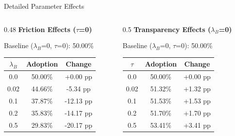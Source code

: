 \documentclass{beamer}
\begin{document}
\begin{frame}{Detailed Parameter Effects}
  \begin{columns}[T]
    \begin{column}{0.48\textwidth}
      \centering
      \textbf{Friction Effects ($\tau$=0)}
      
      \vspace{0.3em}
      \small{Baseline ($\lambda_B$=0, $\tau$=0): 50.00\%}
      
      \vspace{0.5em}
      
      \begin{table}[h]
        \centering
        \begin{tabular}{|c|c|c|}
          \hline
          \textbf{$\lambda_B$} & \textbf{Adoption} & \textbf{Change} \\
          \hline
          0.0 & 50.00\% & +0.00 pp \\
          \hline
          0.02 & 44.66\% & -5.34 pp \\
          \hline
          0.1 & 37.87\% & -12.13 pp \\
          \hline
          0.2 & 35.83\% & -14.17 pp \\
          \hline
          0.5 & 29.83\% & -20.17 pp \\
          \hline
        \end{tabular}
      \end{table}
    \end{column}
    
    \begin{column}{0.5\textwidth}
      \centering
      \textbf{Transparency Effects ($\lambda_B$=0)}
      
      \vspace{0.3em}
      \small{Baseline ($\lambda_B$=0, $\tau$=0): 50.00\%}
      
      \vspace{0.5em}
      
      \begin{table}[h]
        \centering
        \begin{tabular}{|c|c|c|}
          \hline
          \textbf{$\tau$} & \textbf{Adoption} & \textbf{Change} \\
          \hline
          0.0 & 50.00\% & +0.00 pp \\
          \hline
          0.02 & 51.32\% & +1.32 pp \\
          \hline
          0.1 & 51.53\% & +1.53 pp \\
          \hline
          0.2 & 51.70\% & +1.70 pp \\
          \hline
          0.5 & 53.41\% & +3.41 pp \\
          \hline
        \end{tabular}
      \end{table}
    \end{column}
  \end{columns}
\end{frame}
\end{document}

